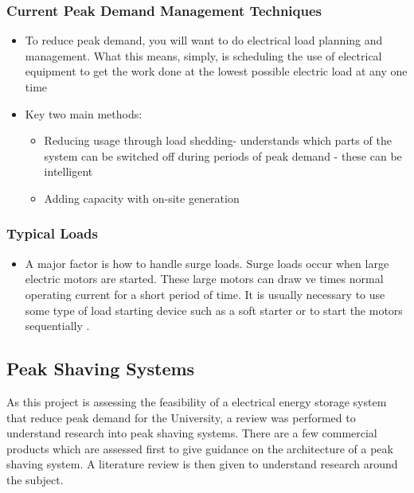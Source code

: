 \subsubsection{Current Peak Demand Management
Techniques}\label{current-peak-demand-management-techniques}

\begin{itemize}
\tightlist
\item
  To reduce peak demand, you will want to do electrical load planning
  and management. What this means, simply, is scheduling the use of
  electrical equipment to get the work done at the lowest possible
  electric load at any one time \cite{Reducing37:online}
\item
  Key two main methods:

  \begin{itemize}
  \tightlist
  \item
    Reducing usage through load shedding- understands which parts of the
    system can be switched off during periods of peak demand - these can
    be intelligent \cite{6199851}
  \item
    Adding capacity with on-site generation \cite{schneiderRECPS}
  \end{itemize}
\end{itemize}

\subsubsection{Typical Loads}\label{typical-loads}

\begin{itemize}
\tightlist
\item
  A major factor is how to handle surge loads. Surge loads occur when
  large electric motors are started. These large motors can draw ve
  times normal operating current for a short period of time. It is
  usually necessary to use some type of load starting device such as a
  soft starter or to start the motors sequentially \cite{baldorPS}.
\end{itemize}

\subsection{Peak Shaving Systems}\label{peak-shaving-systems}

As this project is assessing the feasibility of a electrical energy
storage system that reduce peak demand for the University, a review was
performed to understand research into peak shaving systems. There are a
few commercial products which are assessed first to give guidance on the
architecture of a peak shaving system. A literature review is then given
to understand research around the subject.

